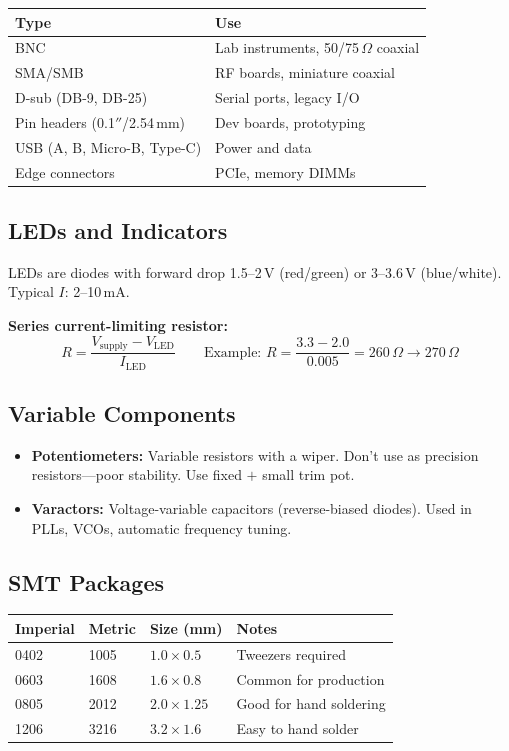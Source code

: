 \documentclass[11pt,a4paper]{article}
\begin{document}
\begin{center}
\begin{tabular}{@{}ll@{}}
\toprule
Type & Use \\
\midrule
BNC & Lab instruments, 50/75\,$\Omega$ coaxial \\
SMA/SMB & RF boards, miniature coaxial \\
D-sub (DB-9, DB-25) & Serial ports, legacy I/O \\
Pin headers (0.1$''$/2.54\,mm) & Dev boards, prototyping \\
USB (A, B, Micro-B, Type-C) & Power and data \\
Edge connectors & PCIe, memory DIMMs \\
\bottomrule
\end{tabular}
\end{center}

\subsection{LEDs and Indicators}

LEDs are diodes with forward drop 1.5--2\,V (red/green) or 3--3.6\,V (blue/white). Typical $I$: 2--10\,mA.

\textbf{Series current-limiting resistor:}
\begin{equation}
R = \frac{V_{\text{supply}} - V_{\text{LED}}}{I_{\text{LED}}}
\qquad \text{Example: } R = \frac{3.3 - 2.0}{0.005} = 260\,\Omega \to 270\,\Omega
\end{equation}

\subsection{Variable Components}

\begin{itemize}[nosep]
\item \textbf{Potentiometers:} Variable resistors with a wiper. Don't use as precision resistors---poor stability. Use fixed $+$ small trim pot.
\item \textbf{Varactors:} Voltage-variable capacitors (reverse-biased diodes). Used in PLLs, VCOs, automatic frequency tuning.
\end{itemize}

\subsection{SMT Packages}

\begin{center}
\begin{tabular}{@{}llll@{}}
\toprule
Imperial & Metric & Size (mm) & Notes \\
\midrule
0402 & 1005 & $1.0 \times 0.5$ & Tweezers required \\
0603 & 1608 & $1.6 \times 0.8$ & Common for production \\
0805 & 2012 & $2.0 \times 1.25$ & Good for hand soldering \\
1206 & 3216 & $3.2 \times 1.6$ & Easy to hand solder \\
\bottomrule
\end{tabular}
\end{center}
\end{document}
